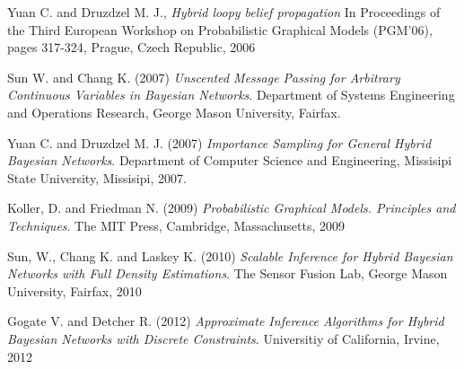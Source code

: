 \documentclass[a4paper,11pt]{article}
\begin{document}
\begin{thebibliography}{}
Yuan C. and Druzdzel M. J., \textit{Hybrid loopy belief propagation} In Proceedings of the Third European Workshop on Probabilistic Graphical Models (PGM'06), pages 317-324, Prague, Czech Republic, 2006

Sun W. and Chang K. (2007) \textit{Unscented Message Passing for Arbitrary Continuous Variables in Bayesian Networks}. Department of Systems Engineering and Operations Research, George Mason University, Fairfax.

Yuan C. and Druzdzel M. J. (2007) \textit{Importance Sampling for General Hybrid Bayesian Networks}. Department of Computer Science and Engineering, Missisipi State University, Missisipi, 2007.

Koller, D. and Friedman N. (2009) \textit{Probabilistic Graphical Models. Principles and Techniques}. The MIT Press, Cambridge, Massachusetts, 2009

Sun, W., Chang K. and Laskey K. (2010) \textit{Scalable Inference for Hybrid Bayesian Networks with Full Density Estimations}. The Sensor Fusion Lab, George Mason University, Fairfax, 2010

Gogate V. and Detcher R. (2012) \textit{Approximate Inference Algorithms for Hybrid Bayesian Networks with Discrete Constraints}. Universitiy of California, Irvine, 2012


\end{thebibliography}
\end{document}
